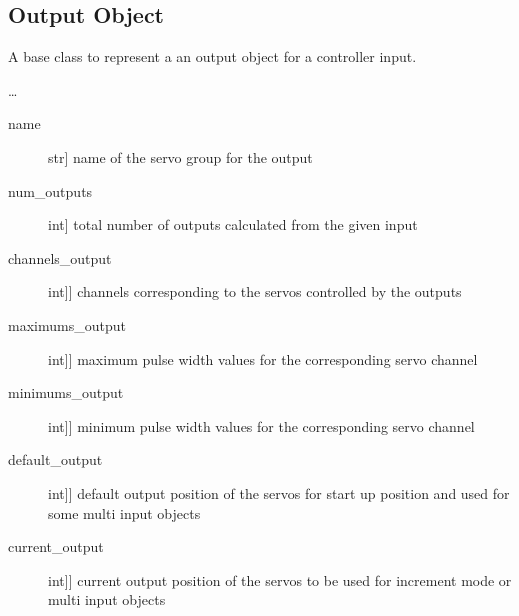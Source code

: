 \documentclass[letterpaper,10pt,english]{sphinxmanual}
\begin{document}
\subsection{Output Object}
\label{\detokenize{base:module-OutputObject}}\label{\detokenize{base:output-object}}

\begin{fulllineitems}
\label{\detokenize{base:OutputObject.OutputObject}}
\sphinxAtStartPar
A base class to represent a an output object for a controller input.

\sphinxAtStartPar
…

\sphinxAtStartPar
{}
\begin{description}
\item[{name}] \leavevmode{[}str{]}
\sphinxAtStartPar
name of the servo group for the output

\item[{num\_outputs}] \leavevmode{[}int{]}
\sphinxAtStartPar
total number of outputs calculated from the given input

\item[{channels\_output}] \leavevmode{[}{[}int{]}{]}
\sphinxAtStartPar
channels corresponding to the servos controlled by the outputs

\item[{maximums\_output}] \leavevmode{[}{[}int{]}{]}
\sphinxAtStartPar
maximum pulse width values for the corresponding servo channel

\item[{minimums\_output}] \leavevmode{[}{[}int{]}{]}
\sphinxAtStartPar
minimum pulse width values for the corresponding servo channel

\item[{default\_output}] \leavevmode{[}{[}int{]}{]}
\sphinxAtStartPar
default output position of the servos for start up position and used for some multi input objects

\item[{current\_output}] \leavevmode{[}{[}int{]}{]}
\sphinxAtStartPar
current output position of the servos to be used for increment mode or multi input objects


\end{description}
\end{fulllineitems}
\end{document}
